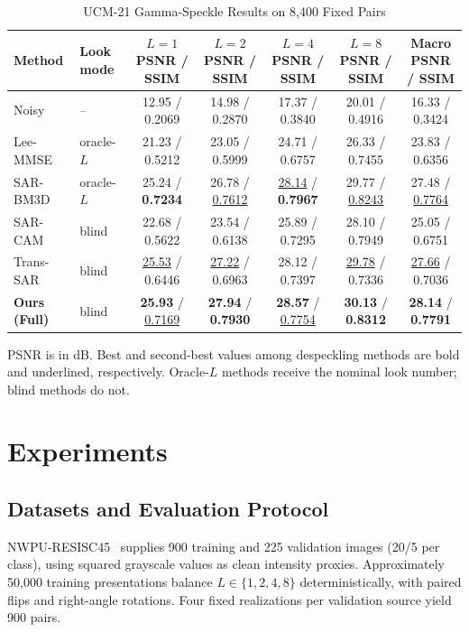 \documentclass[journal]{IEEEtran}
\newcommand{\rev}[1]{{\color{RevisionBlue}#1}}
\newcommand{\condensed}[1]{{\color{CondensedGreen}#1}}
\newcommand{\rev}[1]{#1}
\newcommand{\condensed}[1]{#1}
\begin{document}
\begin{table}[!b]
\caption{UCM-21 Gamma-Speckle Results on 8,400 Fixed Pairs}
\label{tab:main}
\centering
\footnotesize
\setlength{\tabcolsep}{3.2pt}
\renewcommand{\arraystretch}{1.08}
\begin{tabular*}{0.86\textwidth}{@{\extracolsep{\fill}}llccccc@{}}
\toprule
\textbf{Method} & \textbf{Look mode} &
\shortstack{\(L=1\)\\PSNR / SSIM} &
\shortstack{\(L=2\)\\PSNR / SSIM} &
\shortstack{\(L=4\)\\PSNR / SSIM} &
\shortstack{\(L=8\)\\PSNR / SSIM} &
\shortstack{Macro\\PSNR / SSIM} \\
\midrule
Noisy       & --                & 12.95 / 0.2069 & 14.98 / 0.2870 & 17.37 / 0.3840 & 20.01 / 0.4916 & 16.33 / 0.3424 \\
Lee-MMSE    & oracle-\(L\)      & 21.23 / 0.5212 & 23.05 / 0.5999 & 24.71 / 0.6757 & 26.33 / 0.7455 & 23.83 / 0.6356 \\
SAR-BM3D    & oracle-\(L\)      & 25.24 / \textbf{0.7234} & 26.78 / \underline{0.7612} & \underline{28.14} / \textbf{0.7967} & 29.77 / \underline{0.8243} & 27.48 / \underline{0.7764} \\
SAR-CAM     & blind             & 22.68 / 0.5622 & 23.54 / 0.6138 & 25.89 / 0.7295 & 28.10 / 0.7949 & 25.05 / 0.6751 \\
Trans-SAR   & blind             & \underline{25.53} / 0.6446 & \underline{27.22} / 0.6963 & 28.12 / 0.7397 & \underline{29.78} / 0.7336 & \underline{27.66} / 0.7036 \\
\textbf{Ours (Full)} & blind    & \textbf{25.93} / \underline{0.7169} & \textbf{27.94} / \textbf{0.7930} & \textbf{28.57} / \underline{0.7754} & \textbf{30.13} / \textbf{0.8312} & \textbf{28.14} / \textbf{0.7791} \\
\bottomrule
\end{tabular*}
\vspace{1pt}
\parbox{0.86\textwidth}{\footnotesize PSNR is in dB. Best and second-best values among despeckling methods are bold and underlined, respectively. Oracle-\(L\) methods receive the nominal look number; blind methods do not.}
\end{table}

\section{Experiments}
\subsection{Datasets and Evaluation Protocol}
\condensed{NWPU-RESISC45~\cite{cheng2017} supplies 900 training and 225 validation images (20/5 per class), using squared grayscale values as clean intensity proxies. \rev{Approximately 50,000} training presentations balance \(L\in\{1,2,4,8\}\) deterministically, with paired flips and right-angle rotations. Four fixed realizations per validation source yield 900 pairs.}
\end{document}

